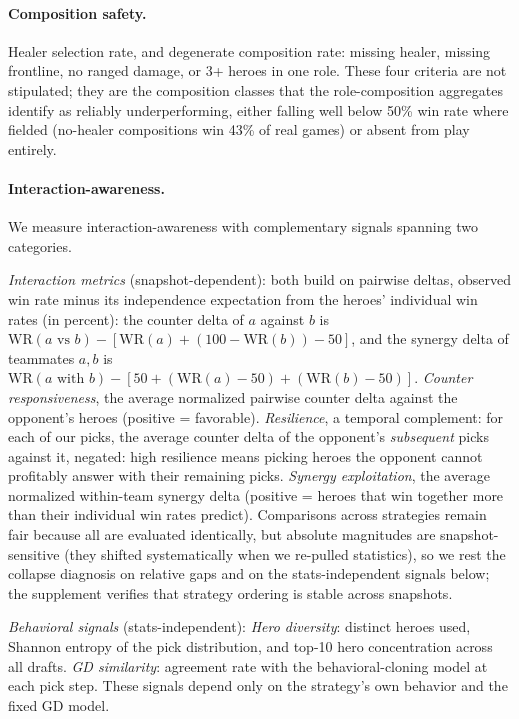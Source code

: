 \documentclass[journal]{IEEEtran}
\begin{document}
\paragraph{Composition safety.} Healer selection rate, and degenerate composition rate: missing healer, missing frontline, no ranged damage, or 3+ heroes in one role. These four criteria are not stipulated; they are the composition classes that the role-composition aggregates identify as reliably underperforming, either falling well below 50\% win rate where fielded (no-healer compositions win 43\% of real games) or absent from play entirely.

\paragraph{Interaction-awareness.} We measure interaction-awareness with complementary signals spanning two categories.

\textit{Interaction metrics} (snapshot-dependent): both build on pairwise deltas, observed win rate minus its independence expectation from the heroes' individual win rates (in percent): the counter delta of $a$ against $b$ is $\mathrm{WR}(a\text{ vs }b) - [\mathrm{WR}(a) + (100 - \mathrm{WR}(b)) - 50]$, and the synergy delta of teammates $a, b$ is $\mathrm{WR}(a\text{ with }b) - [50 + (\mathrm{WR}(a) - 50) + (\mathrm{WR}(b) - 50)]$. \textit{Counter responsiveness}, the average normalized pairwise counter delta against the opponent's heroes (positive = favorable). \textit{Resilience}, a temporal complement: for each of our picks, the average counter delta of the opponent's \textit{subsequent} picks against it, negated: high resilience means picking heroes the opponent cannot profitably answer with their remaining picks. \textit{Synergy exploitation}, the average normalized within-team synergy delta (positive = heroes that win together more than their individual win rates predict). Comparisons across strategies remain fair because all are evaluated identically, but absolute magnitudes are snapshot-sensitive (they shifted systematically when we re-pulled statistics), so we rest the collapse diagnosis on relative gaps and on the stats-independent signals below; the supplement verifies that strategy ordering is stable across snapshots.

\textit{Behavioral signals} (stats-independent): \textit{Hero diversity}: distinct heroes used, Shannon entropy of the pick distribution, and top-10 hero concentration across all drafts. \textit{GD similarity}: agreement rate with the behavioral-cloning model at each pick step. These signals depend only on the strategy's own behavior and the fixed GD model.
\end{document}
